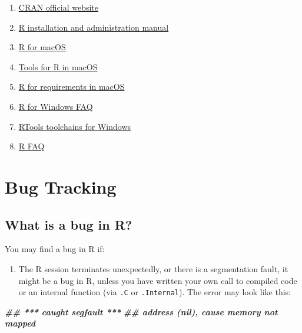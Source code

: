 \documentclass[
]{book}
\newenvironment{Shaded}{\begin{snugshade}}{\end{snugshade}}
\newcommand{\DocumentationTok}[1]{\textcolor[rgb]{0.56,0.35,0.01}{\textbf{\textit{#1}}}}
\providecommand{\tightlist}{%
  \setlength{\itemsep}{0pt}\setlength{\parskip}{0pt}}
\begin{document}
\begin{enumerate}
\def\labelenumi{\arabic{enumi}.}
\item
  \href{https://cran.r-project.org}{CRAN official website}
\item
  \href{https://cran.r-project.org/doc/manuals/r-patched/R-admin.html}{R installation and administration manual}
\item
  \href{https://mac.r-project.org/}{R for macOS}
\item
  \href{https://mac.r-project.org/tools/}{Tools for R in macOS}
\item
  \href{https://mac.r-project.org/src/}{R for requirements in macOS}
\item
  \href{https://cran.r-project.org/bin/windows/base/rw-FAQ.html}{R for Windows FAQ}
\item
  \href{https://cran.r-project.org/bin/windows/Rtools/}{RTools toolchains for Windows}
\item
  \href{https://cran.r-project.org/doc/FAQ/R-FAQ.html}{R FAQ}
\end{enumerate}

\hypertarget{BugTrack}{%
\chapter{Bug Tracking}\label{BugTrack}}

\hypertarget{what-is-a-bug-in-r}{%
\section{What is a bug in R?}\label{what-is-a-bug-in-r}}

You may find a bug in R if:

\begin{enumerate}
\def\labelenumi{\arabic{enumi}.}
\tightlist
\item
  The R session terminates unexpectedly, or there is a segmentation fault, it might be a bug in R, unless you have written your own call to compiled code or an internal function (via \texttt{.C} or \texttt{.Internal}). The error may look like this:
\end{enumerate}

\begin{Shaded}
\begin{Highlighting}[]
\DocumentationTok{\#\#  *** caught segfault ***}
\DocumentationTok{\#\# address (nil), cause \textquotesingle{}memory not mapped\textquotesingle{}}
\end{Highlighting}
\end{Shaded}
\end{document}
